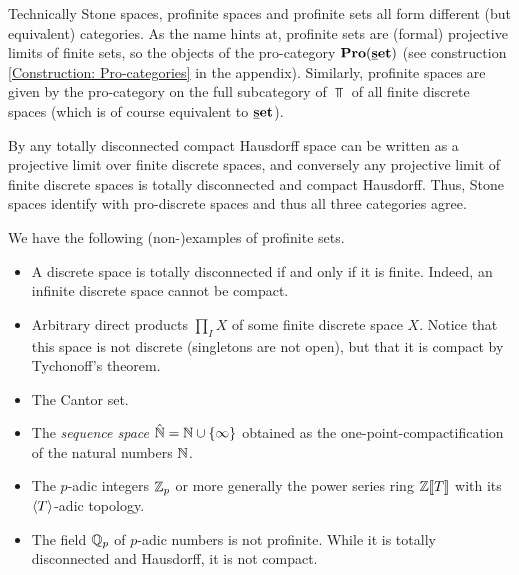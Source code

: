 \begin{remark}
	Technically Stone spaces, profinite spaces and profinite sets all form different (but equivalent) categories. As the name hints at, profinite sets are (formal) projective limits of finite sets, so the objects of the pro-category $\ProCategory{\set}$ (see construction \ref{Construction: Pro-categories} in the appendix). Similarly, profinite spaces are given by the pro-category on the full subcategory of $\Top$ of all finite discrete spaces (which is of course equivalent to ${{\mathbf{\underline{s}et}}}$).
	
	By \eg \cite[\href{https://stacks.math.columbia.edu/tag/08ZY}{Tag 08ZY}]{stacks-project} any totally disconnected compact Hausdorff space can be written as a projective limit over finite discrete spaces, and conversely any projective limit of finite discrete spaces is totally disconnected and compact Hausdorff. Thus, Stone spaces identify with pro-discrete spaces and thus all three categories agree.
\end{remark}

\begin{example}
	We have the following (non-)examples of profinite sets.
	\begin{itemize}
		\item 
		A discrete space is totally disconnected if and only if it is finite. Indeed, an infinite discrete space cannot be compact.
		
		\item 
		Arbitrary direct products $\prod_I X$ of some finite discrete space $X$. Notice that this space is not discrete (\eg singletons are not open), but that it is compact by Tychonoff's theorem.
		
		\item
		The Cantor set.
		
		\item
		The \emph{sequence space} $\hat{{\mathbb{N}}} = {\mathbb{N}}\cup \{\infty\}$ obtained as the one-point-compactification of the natural numbers ${\mathbb{N}}$.
		
		\item
		The $p$-adic integers ${\mathbb{Z}}_p$ or more generally the power series ring ${{\mathbb{Z}}[\![T]\!]}$ with its ${\langle T\rangle}$-adic topology.
		
		\item
		The field ${{\mathbb{Q}}_{p}}$ of $p$-adic numbers is not profinite. While it is totally disconnected and Hausdorff, it is not compact.
	\end{itemize}
\end{example}

